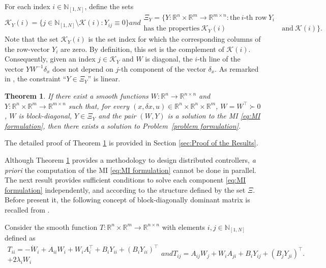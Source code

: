 \documentclass[10pt,twocolumn,twoside]{IEEEtran}
\theoremstyle{plain}
\newtheorem{theorem}{Theorem}
\theoremstyle{definition}
\theoremstyle{remark}
\begin{document}
For each index $i\in\mathbb{N}_{[1,N]}$, define the sets 
\begin{subequations}
	\begin{equation*}
		\mathscr{K}_Y(i)=\{j\in \mathbb{N}_{[1,N]}\setminus\mathscr{K}(i):Y_{ij}\equiv0\}
	\end{equation*}
	and
	\begin{align*}
		\Xi_Y=\{Y:\mathbb{R}^n\times\mathbb{R}^m\to\mathbb{R}^{m\times n}:\text{the}\ i\text{-th row}\ Y_i\ \\
		\text{has the properties}\ \mathscr{K}_Y(i)\ &\text{and}\ \mathscr{K}(i)\}.
	\end{align*}
\end{subequations}
Note that the set $\mathscr{K}_Y(i)$ is the set index for which the corresponding columns of the row-vector $Y_i$ are zero. By definition, this set is the complement of $\mathscr{K}(i)$. Consequently, given an index $j\in\mathscr{K}_Y$ and $W$ is diagonal, the $i$-th line of the vector $YW^{-1}\delta_x$ does not depend on $j$-th component of the vector $\delta_x$. As remarked in \cite{Tanaka2011}, the constraint ``$Y\in\Xi_Y$'' is linear.

\begin{theorem}\label{thm:main result}
	If there exist a smooth functions $W:\mathbb{R}^n\to\mathbb{R}^{n\times n}$ and $Y:\mathbb{R}^n\times\mathbb{R}^m\to\mathbb{R}^{m\times n}$ such that, for every $(x,\delta x,u)\in\mathbb{R}^n\times\mathbb{R}^n\times\mathbb{R}^m$, $W=W^\top\succ0$, $W$ is block-diagonal, $Y\in\Xi_Y$ and the pair $(W,Y)$ is a solution to the MI \eqref{eq:MI formulation}, then there exists a solution to Problem~\ref{problem formulation}.
\end{theorem}

The detailed proof of Theorem \ref{thm:main result} is provided in Section \ref{sec:Proof of the Results}. 

Although Theorem \ref{thm:main result} provides a methodology to design distributed controllers, \emph{a priori} the computation of the MI \eqref{eq:MI formulation}  cannot be done in parallel. The next result provides sufficient conditions to solve each component \eqref{eq:MI formulation} independently, and according to the structure defined by the set $\Xi$. Before present it, the following concept of block-diagonally dominant matrix is recalled from \cite{ZhangLiChen2006}.

Consider the smooth function $T:\mathbb{R}^n\times\mathbb{R}^m\to\mathbb{R}^{n\times n}$ with elements $i,j\in\mathbb{N}_{[1,N]}$ defined as
	\begin{subequations}\label{eq:T}
	\begin{align}
		T_{ii}=-\dot{W}_i+A_{ii}W_i+W_iA_i^\top+B_iY_{ii}+(B_iY_{ii})^\top\nonumber\\
		+2\lambda_i W_i
	\end{align}
	and
	\begin{equation}
		T_{ij}=A_{ij}W_j+W_iA_{ji}+B_iY_{ij}+(B_jY_{ji})^\top.
	\end{equation}
	\end{subequations}
\end{document}
